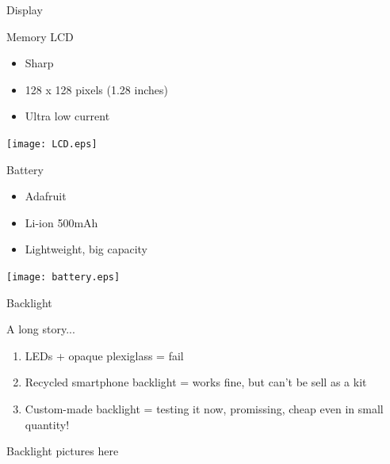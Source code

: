 \documentclass[compress,red]{beamer}
\begin{document}
\begin{frame}{Display}

  \begin{block}{Memory LCD}
    \begin{itemize}
    \item Sharp
    \item 128 x 128 pixels (1.28 inches)
    \item Ultra low current
    \end{itemize}
  \end{block}


  \begin{center}
    \texttt{[image: LCD.eps]}
  \end{center}

  \note[item]{}

\end{frame}

\begin{frame}{Battery}

  \begin{block}{}
    \begin{itemize}
    \item Adafruit
    \item Li-ion 500mAh
    \item Lightweight, big capacity
    \end{itemize}
  \end{block}

  \begin{center}
    \texttt{[image: battery.eps]}
  \end{center}


\end{frame}

\begin{frame}{Backlight}

  \begin{block}{A long story...}
    \begin{enumerate}
    \item LEDs + opaque plexiglass = fail
    \item Recycled smartphone backlight = works fine, but can't be sell as a kit
    \item Custom-made backlight = testing it now, promissing, cheap even in small quantity!
    \end{enumerate}
  \end{block}

  \begin{center}
    Backlight pictures here
  \end{center}

  \note[item]{}

\end{frame}
\end{document}
